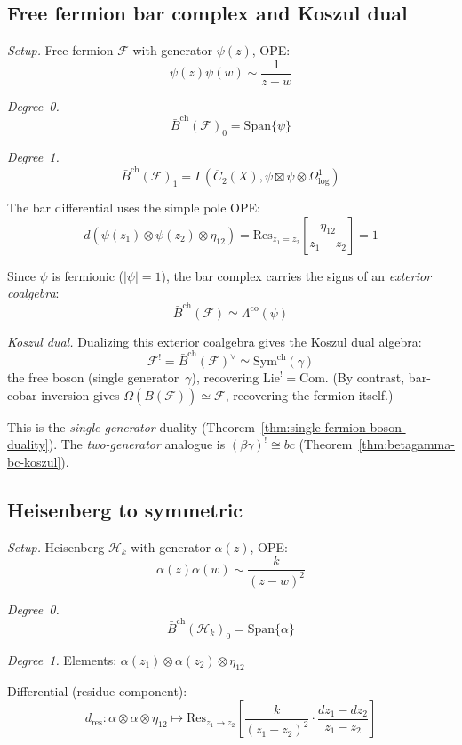 \subsection{Free fermion bar complex and Koszul dual}

\noindent\emph{Setup.} Free fermion $\mathcal{F}$ with generator $\psi(z)$, OPE:
\[\psi(z)\psi(w) \sim \frac{1}{z-w}\]

\emph{Degree~0.}
\[\bar{B}^{\text{ch}}(\mathcal{F})_0 = \text{Span}\{\psi\}\]

\emph{Degree~1.}
\[\bar{B}^{\text{ch}}(\mathcal{F})_1 = \Gamma\left(\overline{C}_2(X),
   \psi \boxtimes \psi \otimes \Omega^1_{\log}\right)\]

The bar differential uses the simple pole OPE:
\[d(\psi(z_1) \otimes \psi(z_2) \otimes \eta_{12}) = \text{Res}_{z_1 = z_2}\left[\frac{\eta_{12}}{z_1-z_2}\right] = 1\]

Since $\psi$ is fermionic ($|\psi| = 1$), the bar complex carries the signs of an \emph{exterior coalgebra}:
\[\bar{B}^{\text{ch}}(\mathcal{F}) \simeq \Lambda^{\text{co}}(\psi)\]

\emph{Koszul dual.} Dualizing this exterior coalgebra gives the Koszul dual algebra:
\[\mathcal{F}^! = \bar{B}^{\mathrm{ch}}(\mathcal{F})^\vee \simeq \mathrm{Sym}^{\mathrm{ch}}(\gamma)\]
the free boson (single generator~$\gamma$), recovering $\mathrm{Lie}^! = \mathrm{Com}$.  (By contrast, bar-cobar inversion gives $\Omega(\bar{B}(\mathcal{F})) \simeq \mathcal{F}$, recovering the fermion itself.)

This is the \emph{single-generator} duality (Theorem~\ref{thm:single-fermion-boson-duality}).  The \emph{two-generator} analogue is $(\beta\gamma)^! \cong bc$ (Theorem~\ref{thm:betagamma-bc-koszul}).

\subsection{Heisenberg to symmetric}

\noindent\emph{Setup.} Heisenberg $\mathcal{H}_k$ with generator $\alpha(z)$, OPE:
\[\alpha(z)\alpha(w) \sim \frac{k}{(z-w)^2}\]

\emph{Degree~0.}
\[\bar{B}^{\text{ch}}(\mathcal{H}_k)_0 = \text{Span}\{\alpha\}\]

\emph{Degree~1.}
Elements: $\alpha(z_1) \otimes \alpha(z_2) \otimes \eta_{12}$

Differential (residue component):
\[d_{\text{res}}: \alpha \otimes \alpha \otimes \eta_{12} \mapsto 
   \text{Res}_{z_1 \to z_2}\left[\frac{k}{(z_1-z_2)^2} \cdot \frac{dz_1-dz_2}{z_1-z_2}\right]\]

